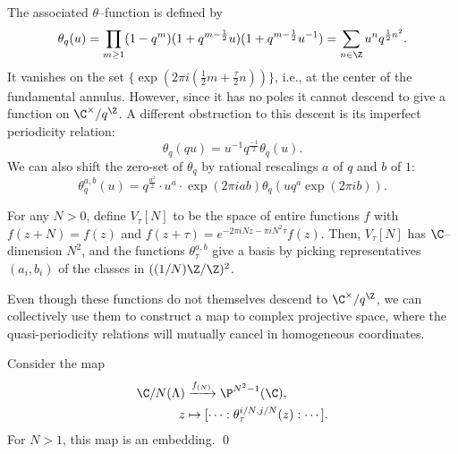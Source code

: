 The associated $\theta$--function is defined by \[\theta_q(u) = \prod_{m \ge 1} (1 - q^m) (1 + q^{m-\frac{1}{2}}u) (1 + q^{m-\frac{1}{2}}u^{-1}) = \sum_{n \in \Z} u^n q^{\frac{1}{2} n^2}.\]  It vanishes on the set $\{\exp(2 \pi i (\frac{1}{2}m + \frac{\tau}{2}n))\}$, i.e., at the center of the fundamental annulus.  However, since it has no poles it cannot descend to give a function on $\C^\times / q^{\Z}$.  A different obstruction to this descent is its imperfect periodicity relation: \[\theta_q(qu) = u^{-1} q^{\frac{-1}{2}} \theta_q(u).\]  We can also shift the zero-set of $\theta_q$ by rational rescalings $a$ of $q$ and $b$ of $1$: \[\theta_q^{a,b}(u) = q^{\frac{a^2}{2}} \cdot u^a \cdot \exp(2 \pi i a b) \theta_q(u q^a \exp(2 \pi i b)).\]

\begin{remark}
For any $N > 0$, define $V_\tau[N]$ to be the space of entire functions $f$ with $f(z + N) = f(z)$ and $f(z + \tau) = e^{-2 \pi i N z - \pi i N^2 \tau} f(z)$.  Then, $V_\tau[N]$ has $\C$--dimension $N^2$, and the functions $\theta_\tau^{a, b}$ give a basis by picking representatives $(a_i, b_i)$ of the classes in $((1/N)\Z / \Z)^2$.
\end{remark}

Even though these functions do not themselves descend to $\C^\times / q^{\Z}$, we can collectively use them to construct a map to complex projective space, where the quasi-periodicity relations will mutually cancel in homogeneous coordinates.
\begin{theorem}
Consider the map
\begin{align*}
\C / N(\Lambda) & \xrightarrow{f_{(N)}} \P^{N^2-1}(\C), \\
z & \mapsto [\cdots : \theta_\tau^{i/N, j/N}(z) : \cdots].
\end{align*}
For $N > 1$, this map is an embedding. \qed
\end{theorem}

